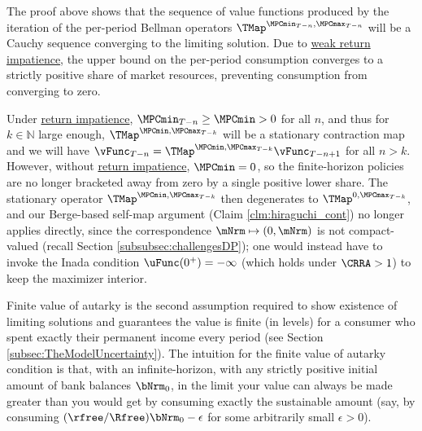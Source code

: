 \documentclass[\econtexRoot/BufferStockTheory]{subfiles}
\begin{document}
The proof above shows that the sequence of value functions produced by the iteration of the per-period Bellman operators $\TMap^{\MPCmin_{T-n}, \MPCmax_{T-n}}$  will be a Cauchy sequence converging to the limiting solution.
Due to \hyperlink{WRIC}{weak return impatience}, the upper bound on the per-period consumption converges to a strictly positive share of market resources, preventing consumption from converging to zero.




\begin{remark}\label{remark:ricstationary}
Under \hyperlink{RIC}{return impatience}, $\MPCmin_{T-n}\geq \MPCmin>0$ for all $n$, and thus for $k\in \mathbb{N}$ large enough, $\TMap^{\MPCmin, \MPCmax_{T-k}}$ will be a stationary contraction map and we will  have $\vFunc_{T-n} = \TMap^{\MPCmin, \MPCmax_{T-k}}\vFunc_{T-n+1}$ for all $n>k$. However, without \hyperlink{RIC}{return impatience}, $\MPCmin = 0$, so the finite-horizon policies are no longer bracketed away from zero by a single positive lower share. The stationary operator $\TMap^{\MPCmin, \MPCmax_{T-k}}$ then degenerates to $\TMap^{0, \MPCmax_{T-k}}$, and our Berge-based self-map argument (Claim \ref{clm:hiraguchi_cont}) no longer applies directly, since the correspondence $\mNrm\mapsto(0,\mNrm)$ is not compact-valued (recall Section \ref{subsubsec:challengesDP}); one would instead have to invoke the Inada condition $\uFunc(0^{+})=-\infty$ (which holds under $\CRRA>1$) to keep the maximizer interior.
\end{remark}


Finite value of autarky is the second assumption required to show existence of limiting solutions and guarantees the value is finite (in levels) for a consumer who spent exactly their permanent income every period (see Section \ref{subsec:TheModelUncertainty}).
The intuition for the finite value of autarky condition is that, with an infinite-horizon, with any strictly positive initial amount of bank balances $\bNrm_{0}$, in the limit your value can always be made greater than you would get by consuming exactly the sustainable amount (say, by consuming $(\rfree/\Rfree)\bNrm_{0}-\epsilon$ for some arbitrarily small $\epsilon>0$).
\end{document}
